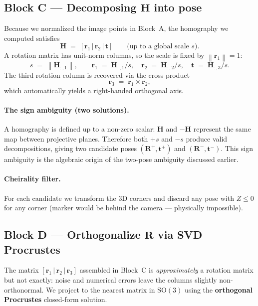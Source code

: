 \documentclass[11pt]{article}
\newcommand{\SO}[1]{\mathrm{SO}(#1)}
\newcommand{\norm}[1]{\left\lVert #1 \right\rVert}
\newcommand{\Hom}{\mathbf{H}}
\begin{document}
\subsection{Block C --- Decomposing \texorpdfstring{$\Hom$}{H} into pose}

Because we normalized the image points in Block~A, the homography we
computed satisfies
\begin{equation}
  \Hom \;=\; [\mathbf{r}_1 \,|\, \mathbf{r}_2 \,|\, \mathbf{t}] \qquad \text{(up to a global scale } s\text{)}.
\end{equation}
A rotation matrix has unit-norm columns, so the scale is fixed by
$\norm{\mathbf{r}_1} = 1$:
\begin{equation}
  s \;=\; \norm{\Hom_{:,1}}, \qquad
  \mathbf{r}_1 \;=\; \Hom_{:,1}/s, \quad
  \mathbf{r}_2 \;=\; \Hom_{:,2}/s, \quad
  \mathbf{t} \;=\; \Hom_{:,3}/s.
\end{equation}
The third rotation column is recovered via the cross product
\begin{equation}
  \mathbf{r}_3 \;=\; \mathbf{r}_1 \times \mathbf{r}_2,
\end{equation}
which automatically yields a right-handed orthogonal axis.

\paragraph{The sign ambiguity (two solutions).}
A homography is defined up to a non-zero scalar: $\Hom$ and $-\Hom$
represent the same map between projective planes. Therefore both
$+s$ and $-s$ produce valid decompositions, giving two candidate poses
$(\mathbf{R}^+, \mathbf{t}^+)$ and $(\mathbf{R}^-, \mathbf{t}^-)$. This sign ambiguity is the
algebraic origin of the two-pose ambiguity discussed earlier.

\paragraph{Cheirality filter.}
For each candidate we transform the 3D corners and discard any pose with
$Z \leq 0$ for any corner (marker would be behind the camera --- physically
impossible).

\subsection{Block D --- Orthogonalize \texorpdfstring{$\mathbf{R}$}{R} via SVD Procrustes}

The matrix $[\mathbf{r}_1\,|\,\mathbf{r}_2\,|\,\mathbf{r}_3]$ assembled in Block~C is
\emph{approximately} a rotation matrix but not exactly: noise and numerical
errors leave the columns slightly non-orthonormal. We project to the
nearest matrix in $\SO{3}$ using the \textbf{orthogonal Procrustes}
closed-form solution.
\end{document}
